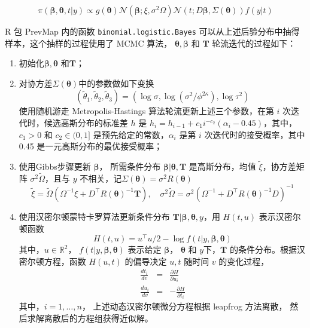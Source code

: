 \documentclass[12pt,a4paper,UTF8,twoside]{book}
\providecommand{\tightlist}{%
  \setlength{\itemsep}{0pt}\setlength{\parskip}{0pt}}
\theoremstyle{definition}
\theoremstyle{definition}
\theoremstyle{definition}
\theoremstyle{remark}
\begin{document}
\begin{equation}
\pi(\boldsymbol{\beta}, \boldsymbol{\theta}, t | y) \propto g(\boldsymbol{\theta})\mathcal{N}(\boldsymbol{\beta}; \xi, \sigma^2 \Omega)\mathcal{N}(t; D\boldsymbol{\beta}, \Sigma(\boldsymbol{\theta}))f(y|t) \label{eq:posterior}
\end{equation}

\noindent R 包 PrevMap 内的函数 \texttt{binomial.logistic.Bayes} 可以从上述后验分布中抽得样本，这个抽样的过程使用了 MCMC 算法， \(\boldsymbol{\theta}, \boldsymbol{\beta}\) 和 \(\mathbf{T}\) 轮流迭代的过程如下：

\begin{enumerate}
\def\labelenumi{\arabic{enumi}.}
\tightlist
\item
  初始化\(\boldsymbol{\beta}, \boldsymbol{\theta}\) 和\(\mathbf{T}\)；
\item
  对协方差\(\Sigma(\boldsymbol{\theta})\)中的参数做如下变换 \citep{Christensen2006} \[(\tilde{\theta}_{1}, \tilde{\theta}_{2}, \tilde{\theta}_{3}) = (\log \sigma, \log (\sigma^2/\phi^{2\kappa}), \log \tau^2)\]
  使用随机游走 Metropolis-Hastings 算法轮流更新上述三个参数，在第 \(i\) 次迭代时，候选高斯分布的标准差 \(h\) 是 \(h_{i} = h_{i-1} + c_{1}i^{-c_{2}}(\alpha_{i}-0.45)\)，其中，\(c_{1} > 0\) 和 \(c_{2} \in (0,1]\) 是预先给定的常数，\(\alpha_i\) 是第 \(i\) 次迭代时的接受概率，其中 0.45 是一元高斯分布的最优接受概率；
\item
  使用Gibbs步骤更新 \(\boldsymbol{\beta}\)， 所需条件分布 \(\boldsymbol{\beta}|\boldsymbol{\theta},\mathbf{T}\) 是高斯分布，均值 \(\tilde{\xi}\)，协方差矩阵 \(\sigma^2\tilde{\Omega}\)，且与 \(y\) 不相关，记\(\Sigma(\boldsymbol{\theta}) = \sigma^2 R(\boldsymbol{\theta})\) \[ \tilde{\xi}  =  \tilde{\Omega}(\Omega^{-1}\xi+D^{\top} R(\boldsymbol{\theta})^{-1} \mathbf{T}), \quad \sigma^2 \tilde{\Omega}  =  \sigma^2(\Omega^{-1} + D^{\top} R(\boldsymbol{\theta})^{-1} D)^{-1} \]
\item
  使用汉密尔顿蒙特卡罗算法更新条件分布 \(\mathbf{T}|\boldsymbol{\beta},\boldsymbol{\theta},y\)，用 \(H(t,u)\) 表示汉密尔顿函数 \[H(t, u) = u^{\top} u/2 - \log f(t | y, \boldsymbol{\beta}, \boldsymbol{\theta})\]
  \noindent 其中，\(u\in\mathbb{R}^2\)， \(f(t | y, \boldsymbol{\beta}, \boldsymbol{\theta})\) 表示给定 \(\boldsymbol{\beta}\)， \(\boldsymbol{\theta}\) 和 \(y\)下，\(\mathbf{T}\) 的条件分布。根据汉密尔顿方程，函数 \(H(u, t)\) 的偏导决定 \(u,t\) 随时间 \(v\) 的变化过程，
  \begin{eqnarray*}
  \frac{d t_{i}}{d v} & = & \frac{\partial H}{\partial u_{i}} \\
  \frac{d u_{i}}{d v} & = & -\frac{\partial H}{\partial t_{i}}
  \end{eqnarray*}
  \noindent 其中，\(i = 1,\ldots, n\)， 上述动态汉密尔顿微分方程根据 leapfrog 方法\citep{Brooks2011}离散， 然后求解离散后的方程组获得近似解。
\end{enumerate}
\end{document}

